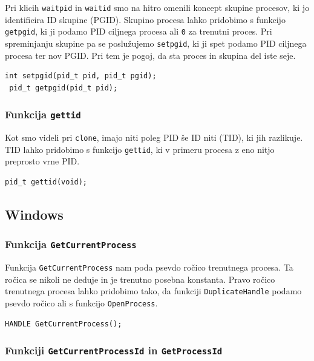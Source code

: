 \documentclass[a4paper,12pt,openright]{book}
\begin{document}
Pri klicih \texttt{waitpid} in \texttt{waitid} smo na hitro omenili koncept skupine procesov, ki jo identificira ID skupine (PGID).
Skupino procesa lahko pridobimo s funkcijo \texttt{getpgid}, ki ji podamo PID ciljnega procesa ali \texttt{0} za trenutni proces.
Pri spreminjanju skupine pa se poslužujemo \texttt{setpgid}, ki ji spet podamo PID ciljnega procesa ter nov PGID.
Pri tem je pogoj, da sta proces in skupina del iste seje.

\begin{lstlisting}[style=func]
 int setpgid(pid_t pid, pid_t pgid);
 pid_t getpgid(pid_t pid);
\end{lstlisting}

\subsubsection{Funkcija \texttt{gettid}}

Kot smo videli pri \texttt{clone}, imajo niti poleg PID še ID niti (TID), ki jih razlikuje.
TID lahko pridobimo s funkcijo \texttt{gettid}, ki v primeru procesa z eno nitjo preprosto vrne PID.

\begin{lstlisting}[style=func]
 pid_t gettid(void);
\end{lstlisting}

\subsection{Windows}

\subsubsection{Funkcija \texttt{GetCurrentProcess}}

Funkcija \texttt{GetCurrentProcess} nam poda psevdo ročico trenutnega procesa.
Ta ročica se nikoli ne deduje in je trenutno posebna konstanta.
Pravo ročico trenutnega procesa lahko pridobimo tako, da funkciji \texttt{DuplicateHandle} podamo psevdo ročico ali s funkcijo \texttt{OpenProcess}.

\begin{lstlisting}[style=func]
 HANDLE GetCurrentProcess();
\end{lstlisting}

\subsubsection{Funkciji \texttt{GetCurrentProcessId} in \texttt{GetProcessId}}
\end{document}
